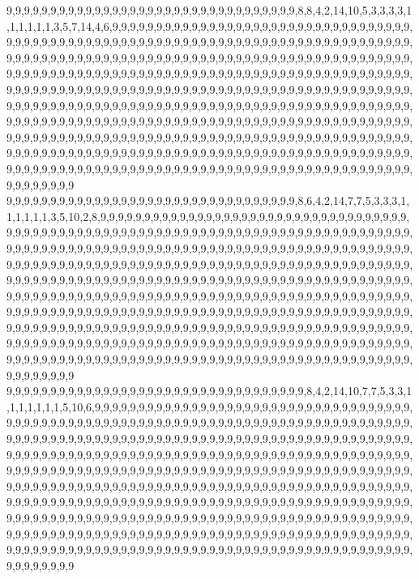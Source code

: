 9,9,9,9,9,9,9,9,9,9,9,9,9,9,9,9,9,9,9,9,9,9,9,9,9,9,9,9,9,9,9,9,9,8,8,4,2,14,10,5,3,3,3,3,1,1,1,1,1,1,3,5,7,14,4,6,9,9,9,9,9,9,9,9,9,9,9,9,9,9,9,9,9,9,9,9,9,9,9,9,9,9,9,9,9,9,9,9,9,9,9,9,9,9,9,9,9,9,9,9,9,9,9,9,9,9,9,9,9,9,9,9,9,9,9,9,9,9,9,9,9,9,9,9,9,9,9,9,9,9,9,9,9,9,9,9,9,9,9,9,9,9,9,9,9,9,9,9,9,9,9,9,9,9,9,9,9,9,9,9,9,9,9,9,9,9,9,9,9,9,9,9,9,9,9,9,9,9,9,9,9,9,9,9,9,9,9,9,9,9,9,9,9,9,9,9,9,9,9,9,9,9,9,9,9,9,9,9,9,9,9,9,9,9,9,9,9,9,9,9,9,9,9,9,9,9,9,9,9,9,9,9,9,9,9,9,9,9,9,9,9,9,9,9,9,9,9,9,9,9,9,9,9,9,9,9,9,9,9,9,9,9,9,9,9,9,9,9,9,9,9,9,9,9,9,9,9,9,9,9,9,9,9,9,9,9,9,9,9,9,9,9,9,9,9,9,9,9,9,9,9,9,9,9,9,9,9,9,9,9,9,9,9,9,9,9,9,9,9,9,9,9,9,9,9,9,9,9,9,9,9,9,9,9,9,9,9,9,9,9,9,9,9,9,9,9,9,9,9,9,9,9,9,9,9,9,9,9,9,9,9,9,9,9,9,9,9,9,9,9,9,9,9,9,9,9,9,9,9,9,9,9,9,9,9,9,9,9,9,9,9,9,9,9,9,9,9,9,9,9,9,9,9,9,9,9,9,9,9,9,9,9,9,9,9,9,9,9,9,9,9,9,9,9,9,9,9,9,9,9,9,9,9,9,9,9,9,9,9,9,9,9,9,9,9,9,9,9,9,9,9,9,9,9,9,9,9,9,9,9,9,9,9,9,9,9,9,9,9,9,9,9,9,9,9,9,9,9,9,9,9,9,9,9,9,9,9,9,9,9,9,9,9,9,9,9,9,9,9,9,9,9,9,9,9,9,9,9,9,9,9,9
9,9,9,9,9,9,9,9,9,9,9,9,9,9,9,9,9,9,9,9,9,9,9,9,9,9,9,9,9,9,9,9,9,8,6,4,2,14,7,7,5,3,3,3,1,1,1,1,1,1,3,5,10,2,8,9,9,9,9,9,9,9,9,9,9,9,9,9,9,9,9,9,9,9,9,9,9,9,9,9,9,9,9,9,9,9,9,9,9,9,9,9,9,9,9,9,9,9,9,9,9,9,9,9,9,9,9,9,9,9,9,9,9,9,9,9,9,9,9,9,9,9,9,9,9,9,9,9,9,9,9,9,9,9,9,9,9,9,9,9,9,9,9,9,9,9,9,9,9,9,9,9,9,9,9,9,9,9,9,9,9,9,9,9,9,9,9,9,9,9,9,9,9,9,9,9,9,9,9,9,9,9,9,9,9,9,9,9,9,9,9,9,9,9,9,9,9,9,9,9,9,9,9,9,9,9,9,9,9,9,9,9,9,9,9,9,9,9,9,9,9,9,9,9,9,9,9,9,9,9,9,9,9,9,9,9,9,9,9,9,9,9,9,9,9,9,9,9,9,9,9,9,9,9,9,9,9,9,9,9,9,9,9,9,9,9,9,9,9,9,9,9,9,9,9,9,9,9,9,9,9,9,9,9,9,9,9,9,9,9,9,9,9,9,9,9,9,9,9,9,9,9,9,9,9,9,9,9,9,9,9,9,9,9,9,9,9,9,9,9,9,9,9,9,9,9,9,9,9,9,9,9,9,9,9,9,9,9,9,9,9,9,9,9,9,9,9,9,9,9,9,9,9,9,9,9,9,9,9,9,9,9,9,9,9,9,9,9,9,9,9,9,9,9,9,9,9,9,9,9,9,9,9,9,9,9,9,9,9,9,9,9,9,9,9,9,9,9,9,9,9,9,9,9,9,9,9,9,9,9,9,9,9,9,9,9,9,9,9,9,9,9,9,9,9,9,9,9,9,9,9,9,9,9,9,9,9,9,9,9,9,9,9,9,9,9,9,9,9,9,9,9,9,9,9,9,9,9,9,9,9,9,9,9,9,9,9,9,9,9,9,9,9,9,9,9,9,9,9,9,9,9,9,9,9,9,9,9,9,9,9,9,9,9,9,9,9,9,9,9,9,9,9,9,9,9,9,9,9,9,9,9
9,9,9,9,9,9,9,9,9,9,9,9,9,9,9,9,9,9,9,9,9,9,9,9,9,9,9,9,9,9,9,9,9,9,8,4,2,14,10,7,7,5,3,3,1,1,1,1,1,1,1,5,10,6,9,9,9,9,9,9,9,9,9,9,9,9,9,9,9,9,9,9,9,9,9,9,9,9,9,9,9,9,9,9,9,9,9,9,9,9,9,9,9,9,9,9,9,9,9,9,9,9,9,9,9,9,9,9,9,9,9,9,9,9,9,9,9,9,9,9,9,9,9,9,9,9,9,9,9,9,9,9,9,9,9,9,9,9,9,9,9,9,9,9,9,9,9,9,9,9,9,9,9,9,9,9,9,9,9,9,9,9,9,9,9,9,9,9,9,9,9,9,9,9,9,9,9,9,9,9,9,9,9,9,9,9,9,9,9,9,9,9,9,9,9,9,9,9,9,9,9,9,9,9,9,9,9,9,9,9,9,9,9,9,9,9,9,9,9,9,9,9,9,9,9,9,9,9,9,9,9,9,9,9,9,9,9,9,9,9,9,9,9,9,9,9,9,9,9,9,9,9,9,9,9,9,9,9,9,9,9,9,9,9,9,9,9,9,9,9,9,9,9,9,9,9,9,9,9,9,9,9,9,9,9,9,9,9,9,9,9,9,9,9,9,9,9,9,9,9,9,9,9,9,9,9,9,9,9,9,9,9,9,9,9,9,9,9,9,9,9,9,9,9,9,9,9,9,9,9,9,9,9,9,9,9,9,9,9,9,9,9,9,9,9,9,9,9,9,9,9,9,9,9,9,9,9,9,9,9,9,9,9,9,9,9,9,9,9,9,9,9,9,9,9,9,9,9,9,9,9,9,9,9,9,9,9,9,9,9,9,9,9,9,9,9,9,9,9,9,9,9,9,9,9,9,9,9,9,9,9,9,9,9,9,9,9,9,9,9,9,9,9,9,9,9,9,9,9,9,9,9,9,9,9,9,9,9,9,9,9,9,9,9,9,9,9,9,9,9,9,9,9,9,9,9,9,9,9,9,9,9,9,9,9,9,9,9,9,9,9,9,9,9,9,9,9,9,9,9,9,9,9,9,9,9,9,9,9,9,9,9,9,9,9,9,9,9,9,9,9,9,9,9,9,9,9,9,9,9,9,9
